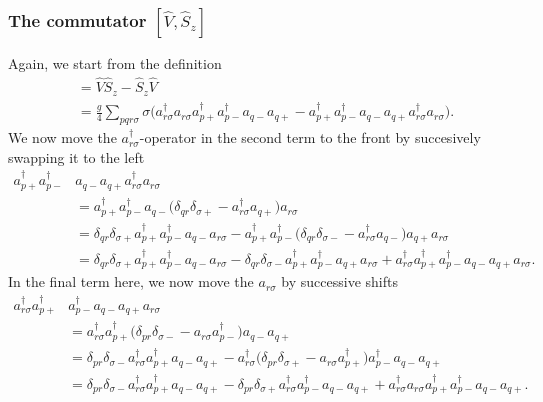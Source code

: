 \documentclass[a4paper, 11pt, notitlepage, english]{article}
\newcommand{\op}[1]{\hat{#1}}
\begin{document}
\subsubsection*{The commutator $[\op{V}, \op{S}_z]$}
Again, we start from the definition
\begin{align*}
[\op{V}, \op{S}_z] &= \op{V}\op{S}_z - \op{S}_z\op{V} \\
&= \frac{g}{4}\sum_{pqr\sigma} \sigma \bigg(a_{r\sigma}^\dagger a_{r\sigma} a_{p+}^\dagger a_{p-}^\dagger a_{q-} a_{q+} - a_{p+}^\dagger a_{p-}^\dagger a_{q-} a_{q+} a_{r\sigma}^\dagger a_{r\sigma} \bigg).
\end{align*}
We now move the $a_{r\sigma}^\dagger$-operator in the second term to the front by succesively swapping it to the left
\begin{align*}
a_{p+}^\dagger a_{p-}^\dagger &a_{q-} a_{q+} a_{r\sigma}^\dagger a_{r\sigma} \\ 
&= a_{p+}^\dagger a_{p-}^\dagger a_{q-} \big(\delta_{qr}\delta_{\sigma+} -  a_{r\sigma}^\dagger a_{q+} \big) a_{r\sigma} \\
&=\delta_{qr}\delta_{\sigma+} a_{p+}^\dagger a_{p-}^\dagger a_{q-} a_{r\sigma}  - a_{p+}^\dagger a_{p-}^\dagger \big(\delta_{qr}\delta_{\sigma-} -  a_{r\sigma}^\dagger a_{q-} \big) a_{q+} a_{r\sigma} \\
&=\delta_{qr}\delta_{\sigma+} a_{p+}^\dagger a_{p-}^\dagger a_{q-} a_{r\sigma}  - \delta_{qr}\delta_{\sigma-} a_{p+}^\dagger a_{p-}^\dagger a_{q+} a_{r\sigma} +  a_{r\sigma}^\dagger  a_{p+}^\dagger a_{p-}^\dagger a_{q-}  a_{q+} a_{r\sigma}.
\end{align*}
In the final term here, we now move the $a_{r\sigma}$ by successive shifts
\begin{align*}
a_{r\sigma}^\dagger  a_{p+}^\dagger & a_{p-}^\dagger a_{q-}  a_{q+} a_{r\sigma} \\
&= a_{r\sigma}^\dagger  a_{p+}^\dagger \big(\delta_{pr} \delta_{\sigma -} -  a_{r\sigma} a_{p-}^\dagger\big) a_{q-}  a_{q+} \\
&= \delta_{pr} \delta_{\sigma -} a_{r\sigma}^\dagger  a_{p+}^\dagger a_{q-}  a_{q+} -  a_{r\sigma}^\dagger  \big(\delta_{pr}\delta_{\sigma+} - a_{r\sigma}a_{p+}^\dagger\big) a_{p-}^\dagger a_{q-}  a_{q+} \\
&= \delta_{pr} \delta_{\sigma -} a_{r\sigma}^\dagger  a_{p+}^\dagger a_{q-}  a_{q+} -  \delta_{pr}\delta_{\sigma+} a_{r\sigma}^\dagger  a_{p-}^\dagger a_{q-}  a_{q+} + a_{r\sigma}^\dagger a_{r\sigma}a_{p+}^\dagger a_{p-}^\dagger a_{q-}  a_{q+}.\\
\end{align*}
\end{document}

